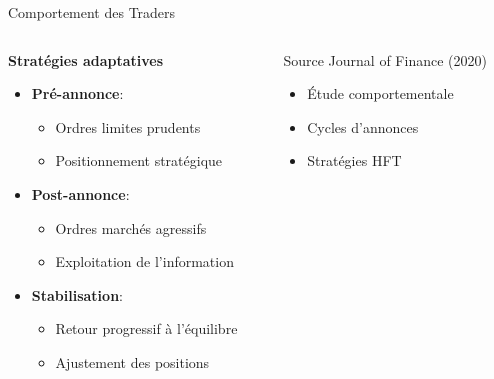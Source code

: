 \documentclass[aspectratio=169]{beamer}  %
\begin{document}
\begin{frame}{Comportement des Traders}
    \begin{columns}
        \begin{column}{0.6\textwidth}
            \textbf{Stratégies adaptatives}
            \begin{itemize}
                \item \textbf{Pré-annonce}:
                \begin{itemize}
                    \item Ordres limites prudents
                    \item Positionnement stratégique
                \end{itemize}
                \item \textbf{Post-annonce}:
                \begin{itemize}
                    \item Ordres marchés agressifs
                    \item Exploitation de l'information
                \end{itemize}
                \item \textbf{Stabilisation}:
                \begin{itemize}
                    \item Retour progressif à l'équilibre
                    \item Ajustement des positions
                \end{itemize}
            \end{itemize}
        \end{column}
        \begin{column}{0.4\textwidth}
            \begin{alertblock}{Source}
                \small{Journal of Finance (2020)}
                \begin{itemize}
                    \item Étude comportementale
                    \item Cycles d'annonces
                    \item Stratégies HFT
                \end{itemize}
            \end{alertblock}
        \end{column}
    \end{columns}
\end{frame}
\end{document}
